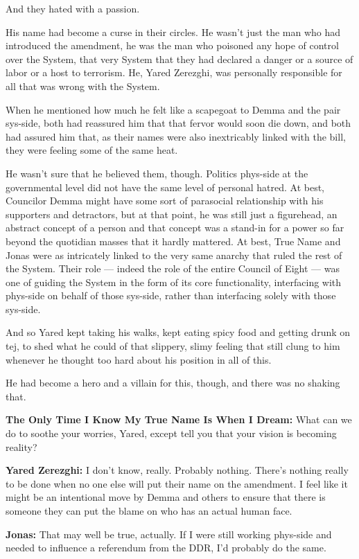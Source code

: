 And they hated with a passion.

His name had become a curse in their circles. He wasn't just the man who had introduced the amendment, he was the man who poisoned any hope of control over the System, that very System that they had declared a danger or a source of labor or a host to terrorism. He, Yared Zerezghi, was personally responsible for all that was wrong with the System.

When he mentioned how much he felt like a scapegoat to Demma and the pair sys-side, both had reassured him that that fervor would soon die down, and both had assured him that, as their names were also inextricably linked with the bill, they were feeling some of the same heat.

He wasn't sure that he believed them, though. Politics phys-side at the governmental level did not have the same level of personal hatred. At best, Councilor Demma might have some sort of parasocial relationship with his supporters and detractors, but at that point, he was still just a figurehead, an abstract concept of a person and that concept was a stand-in for a power so far beyond the quotidian masses that it hardly mattered. At best, True Name and Jonas were as intricately linked to the very same anarchy that ruled the rest of the System. Their role — indeed the role of the entire Council of Eight — was one of guiding the System in the form of its core functionality, interfacing with phys-side on behalf of those sys-side, rather than interfacing solely with those sys-side.

And so Yared kept taking his walks, kept eating spicy food and getting drunk on tej, to shed what he could of that slippery, slimy feeling that still clung to him whenever he thought too hard about his position in all of this.

He had become a hero and a villain for this, though, and there was no shaking that.

\textbf{The Only Time I Know My True Name Is When I Dream:} What can we do to soothe your worries, Yared, except tell you that your vision is becoming reality?

\textbf{Yared Zerezghi:} I don't know, really. Probably nothing. There's nothing really to be done when no one else will put their name on the amendment. I feel like it might be an intentional move by Demma and others to ensure that there is someone they can put the blame on who has an actual human face.

\textbf{Jonas:} That may well be true, actually. If I were still working phys-side and needed to influence a referendum from the DDR, I'd probably do the same.

